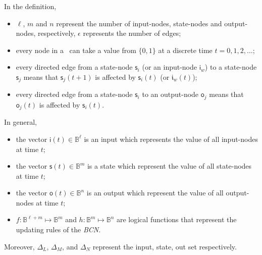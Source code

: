 In the definition, %
\begin{itemize}
	\item $\ell$, $m$ and $n$ represent the number of input-nodes, state-nodes and output-nodes, respectively, $\epsilon$ represents the number of edges;
          \item every node in a \BCN\ can take a value from $\{0,1\}$ at a discrete time $t=0, 1, 2,\ldots$;
	\item every directed edge from a state-node $\mathsf{s}_i$ (or an input-node $\mathsf{i}_w$) to a state-node $\mathsf{s}_j$ means that  $\mathsf{s}_j(t+1)$ is affected by $\mathsf{s}_i(t)$ (or $\mathfrak{i}_w(t)$);	
	\item every directed edge from a state-node $\mathsf{s}_i$ to an output-node $\mathsf{o}_j$ means that   $\mathsf{o}_j(t)$  is affected by $\mathsf{s}_i(t)$.  
	\end{itemize}
In general, 
	\begin{itemize}
	\item the vector $\mathsf{i}(t)\in \mathbb{B}^{\ell}$ is an input which represents the value of all input-nodes at time $t$; 	
	\item the vector $\mathsf{s}(t)\in \mathbb{B}^m$ is a state which represent the value of all state-nodes at time $t$; 	
	\item the vector $\mathsf{o}(t)\in \mathbb{B}^n$ is an output which represent the value of all output-nodes at time $t$;  
	\item $f:\mathbb{B}^{\ell +m}\mapsto \mathbb{B}^m$ and $h:\mathbb{B}^m\mapsto \mathbb{B}^n$ are logical functions that represent the updating rules of the {\em BCN}.
\end{itemize}

Moreover, $\Delta_L $, $\Delta_M$, and $\Delta_N$ represent the input, state, out set respectively. 

